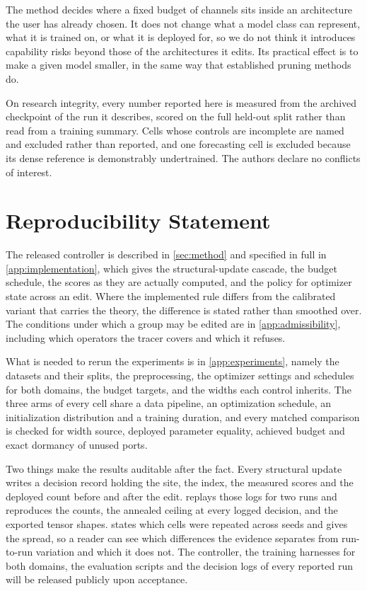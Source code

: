 \documentclass[10pt]{article}
\theoremstyle{paper}
\begin{document}
The method decides where a fixed budget of channels sits inside an architecture the user has
already chosen. It does not change what a model class can represent, what it is trained on, or what
it is deployed for, so we do not think it introduces capability risks beyond those of the
architectures it edits. Its practical effect is to make a given model smaller, in the same way that
established pruning methods do.

On research integrity, every number reported here is measured from the archived checkpoint of the
run it describes, scored on the full held-out split rather than read from a training summary. Cells
whose controls are incomplete are named and excluded rather than reported, and one forecasting cell
is excluded because its dense reference is demonstrably undertrained. The authors declare no
conflicts of interest.

\section*{Reproducibility Statement}
The released controller is described in \cref{sec:method} and specified in full in
\cref{app:implementation}, which gives the structural-update cascade, the budget schedule, the
scores as they are actually computed, and the policy for optimizer state across an edit. Where the
implemented rule differs from the calibrated variant that carries the theory, the difference is
stated rather than smoothed over. The conditions under which a group may be edited are in
\cref{app:admissibility}, including which operators the tracer covers and which it refuses.

What is needed to rerun the experiments is in \cref{app:experiments}, namely the datasets and their
splits, the preprocessing, the optimizer settings and schedules for both domains, the budget
targets, and the widths each control inherits. The three arms of every cell share a data pipeline,
an optimization schedule, an initialization distribution and a training duration, and every matched
comparison is checked for width source, deployed parameter equality, achieved budget and exact
dormancy of unused ports.

Two things make the results auditable after the fact. Every structural update writes a decision
record holding the site, the index, the measured scores and the deployed count before and after the
edit.  replays those logs for two runs and reproduces the counts, the
annealed ceiling at every logged decision, and the exported tensor shapes.  states
which cells were repeated across seeds and gives the spread, so a reader can see which differences
the evidence separates from run-to-run variation and which it does not. The controller, the training harnesses for both domains, the evaluation scripts and the decision logs of every reported run will be released publicly upon acceptance.
\end{document}

